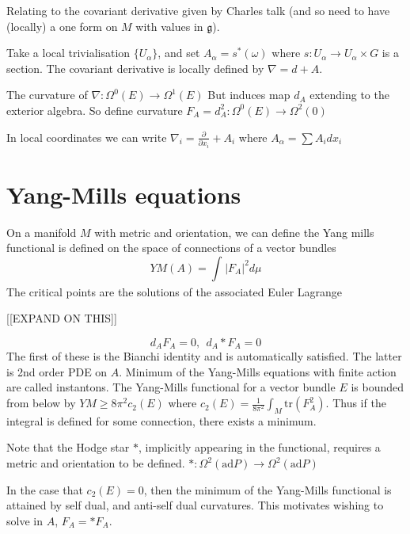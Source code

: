 Relating to the covariant derivative given by Charles talk
(and so need to have (locally) a one form on $M$ with values in $ \mathfrak{g} $). 

Take a local trivialisation $ \{U_\alpha \} $, 
and set $ A_\alpha = s^* (\omega) $ 
where $ s: U_\alpha \rightarrow U_\alpha \times G $ is a section. 
The covariant derivative is locally defined by $ \nabla = d + A $.

The curvature of $ \nabla : \Omega^0 ( E) \rightarrow  \Omega^1 ( E) $
But induces map $d_A$ extending to the exterior algebra. 
So define curvature $F_A = d_A ^2 : \Omega^0 ( E ) \rightarrow \Omega^2(0)$ 

In local coordinates we can write 
$\nabla _i = \frac{\partial}{\partial x_i } + A_i $ where 
$ A_\alpha = \sum A_i dx_i $



\section{Yang-Mills equations} %

On a manifold $M$ with metric and orientation, 
we can define the Yang mills functional is defined on the space of connections of a vector bundles
\begin{equation}
    YM(A) = \int _{} | F_A | ^2 d \mu 
\end{equation}
The critical points are the solutions of the associated Euler Lagrange

[[EXPAND ON THIS]] 

\begin{equation}
     d_A F_A = 0, ~~ d_A * F_A = 0 
\end{equation}
The first of these is the Bianchi identity and is automatically satisfied. 
The latter is 2nd order PDE on $A$.
Minimum of the Yang-Mills equations with finite action are called instantons.  
The Yang-Mills functional for a vector bundle $E$ is bounded from below by $ YM \geq 8 \pi ^2 c_2 (E) $ 
where $ c_2 (E) = \frac{1}{8 \pi^2} \int_M \mathrm{tr} (F_A ^2) $. 
Thus if the integral is defined for some connection, there exists a minimum. 

Note that the Hodge star $*$, implicitly appearing in the functional, requires a metric and orientation to be defined.  
  $ * : \Omega^2(\mathrm{ad}P)  \rightarrow  \Omega^2(\mathrm{ad}P) $ 

  In the case that $ c_2 ( E) = 0 $, then the minimum of the Yang-Mills functional is attained by self dual, and anti-self dual curvatures. 
  This motivates wishing to solve in $A$, $F_A = * F_A $. 

